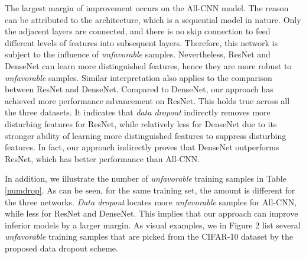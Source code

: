 \documentclass[10pt, conference, letterpaper]{IEEEtran}
\begin{document}
The largest margin of improvement occurs on the All-CNN model. The reason can be attributed to the architecture, which is a sequential model in nature. Only the adjacent layers are connected, and there is no skip connection to feed different levels of features into subsequent layers. Therefore, this network is subject to the influence of \emph{unfavorable} samples. Nevertheless, ResNet and DenseNet can learn more distinguished features, hence they are more robust to \emph{unfavorable} samples. Similar interpretation also applies to the comparison between ResNet and DenseNet. Compared to DenseNet, our approach has achieved more performance advancement on ResNet. This holds true across all the three datasets. It indicates that \emph{data dropout} indirectly removes more disturbing features for ResNet, while relatively less for DenseNet due to its stronger ability of learning more distinguished features to suppress disturbing features. In fact, our approach indirectly proves that DenseNet outperforms ResNet, which has better performance than All-CNN. 

In addition, we illustrate the number of \emph{unfavorable} training samples in Table \ref{numdrop}. As can be seen, for the same training set, the amount is different for the three networks. \emph{Data dropout} locates more \emph{unfavorable} samples for All-CNN, while less for ResNet and DenseNet. This implies that our approach can improve inferior models by a larger margin. As visual examples, we in Figure 2 list several \emph{unfavorable} training samples that are picked from the CIFAR-10 dataset by the proposed data dropout scheme.    

\renewcommand{\arraystretch}{1.06}
\setlength{\tabcolsep}{1.0em}
\begin{table}[]
\center
\vspace{0.5ex}
\caption{The number of \emph{unfavorable} training samples found for different models on the selected datasets.}
\label{numdrop}
\vspace{-1ex}
\end{table}
\end{document}
